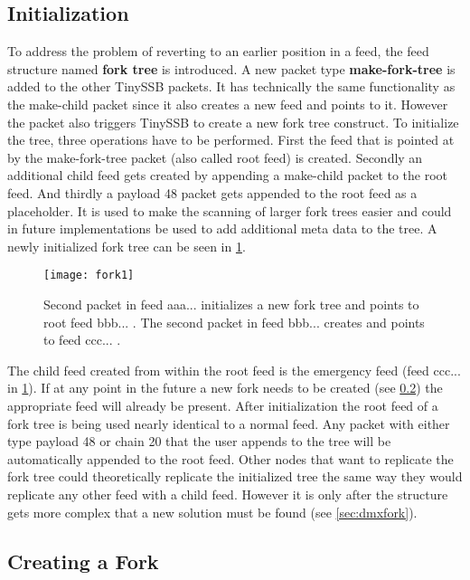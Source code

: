 \subsection{Initialization}
To address the problem of reverting to an earlier position in a feed, the feed structure named \textbf{fork tree} is introduced. A new packet type \textbf{make-fork-tree} is added to the other TinySSB packets. It has technically the same functionality as the make-child packet since it also creates a new feed and points to it. However the packet also triggers TinySSB to create a new fork tree construct. To initialize the tree, three operations have to be performed. First the feed that is pointed at by the make-fork-tree packet (also called root feed) is created. Secondly an additional child feed gets created by appending a make-child packet to the root feed. And thirdly a payload 48 packet gets appended to the root feed as a placeholder. It is used to make the scanning of larger fork trees easier and could in future implementations be used to add additional meta data to the tree. A newly initialized fork tree can be seen in \cref{fig:fork1}.

\begin{figure}
\centering
\texttt{[image: fork1]}
\caption{Second packet in feed aaa... initializes a new fork tree and points to root feed bbb... . The second packet in feed bbb... creates and points to feed ccc... .}
\label{fig:fork1}
\end{figure}
 
The child feed created from within the root feed is the emergency feed (feed ccc... in \cref{fig:fork1}). If at any point in the future a new fork needs to be created (see \cref{sec:forking}) the appropriate feed will already be present. After initialization the root feed of a fork tree is being used nearly identical to a normal feed. Any packet with either type payload 48 or chain 20 that the user appends to the tree will be automatically appended to the root feed. Other nodes that want to replicate the fork tree could theoretically replicate the initialized tree the same way they would replicate any other feed with a child feed. However it is only after the structure gets more complex that a new solution must be found (see \cref{sec:dmxfork}).

\subsection{Creating a Fork}
\label{sec:forking}

